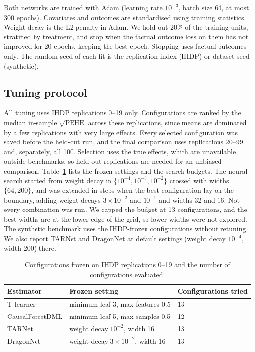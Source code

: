 \documentclass[10pt]{article}
\begin{document}
Both networks are trained with Adam (learning rate $10^{-3}$, batch size 64, at most 300 epochs). Covariates and outcomes are standardised using training statistics. Weight decay is the L2 penalty in Adam. We hold out 20\% of the training units, stratified by treatment, and stop when the factual outcome loss on them has not improved for 20 epochs, keeping the best epoch. Stopping uses factual outcomes only. The random seed of each fit is the replication index (IHDP) or dataset seed (synthetic).

\subsection{Tuning protocol}

All tuning uses IHDP replications 0--19 only. Configurations are ranked by the median in-sample $\sqrt{\mathrm{PEHE}}$ across these replications, since means are dominated by a few replications with very large effects. Every selected configuration was saved before the held-out run, and the final comparison uses replications 20--99 and, separately, all 100. Selection uses the true effects, which are unavailable outside benchmarks, so held-out replications are needed for an unbiased comparison. Table~\ref{tab:configs} lists the frozen settings and the search budgets. The neural search started from weight decay in $\{10^{-4},10^{-3},10^{-2}\}$ crossed with widths $\{64,200\}$, and was extended in steps when the best configuration lay on the boundary, adding weight decays $3\times10^{-2}$ and $10^{-1}$ and widths 32 and 16. Not every combination was run. We capped the budget at 13 configurations, and the best widths are at the lower edge of the grid, so lower widths were not explored. The synthetic benchmark uses the IHDP-frozen configurations without retuning. We also report TARNet and DragonNet at default settings (weight decay $10^{-4}$, width 200) there.

\begin{table}[t]
\centering
\small
\caption{Configurations frozen on IHDP replications 0--19 and the number of configurations evaluated.}
\label{tab:configs}
\begin{tabular}{lll}
\toprule
Estimator & Frozen setting & Configurations tried \\
\midrule
T-learner & minimum leaf 3, max features 0.5 & 13 \\
CausalForestDML & minimum leaf 5, max samples 0.5 & 12 \\
TARNet & weight decay $10^{-2}$, width 16 & 13 \\
DragonNet & weight decay $3\times10^{-2}$, width 16 & 13 \\
\bottomrule
\end{tabular}
\end{table}
\end{document}
